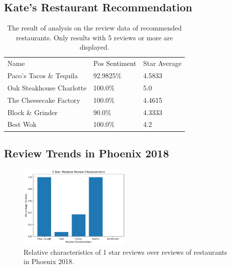 \subsection{Kate's Restaurant Recommendation}
\begin{table}[h]
    \small
    \centering
    \caption{The result of analysis on the review data of recommended restaurants. Only results with 5 reviews or more are displayed.}
    \begin{tabular}{ |p{3.25cm}||p{1.78cm}|p{1.59cm}|}
        \hline
        \rowcolor{Gray}
        \multicolumn{3}{|c|}{Businesses in Phoenix 2018} \\
        \hline
        \rowcolor{LightGray}
        Name & Pos Sentiment & Star Average                 \\
        \hline
        Paco's Tacos \& Tequila     & 92.9825\%  & 4.5833 \\
        Oak Steakhouse Charlotte    & 100.0\%    & 5.0 \\
        The Cheesecake Factory      & 100.0\%    & 4.4615 \\
        Block \& Grinder            & 90.0\%     & 4.3333 \\
        Best Wok                    & 100.0\%    & 4.2 \\
        \hline
    \end{tabular}
    \label{tab:kateResult}
\end{table}

\subsection{Review Trends in Phoenix 2018}

\begin{figure}[h]
    \centering
    \includegraphics[width=0.49\textwidth]{img/phoenix2018/1Star.pdf}
    \caption{Relative characteristics of 1 star reviews over reviews of restaurants in Phoenix 2018.}
    \label{fig:1star}
\end{figure}

